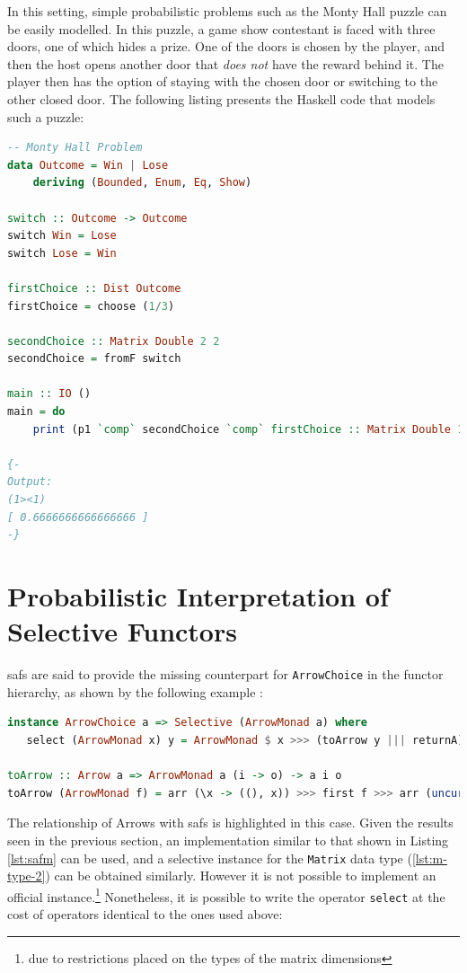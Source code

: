 \documentclass[
  oneside,
  11pt, a4paper,
  footinclude=true,
  headinclude=true,
  cleardoublepage=empty
]{scrbook}
\theoremstyle{definition}
\theoremstyle{definition}
\begin{document}
        In this setting, simple probabilistic problems such as the Monty Hall puzzle \citep{rosenhouse2009monty} can be easily modelled.
        In this puzzle, a game show contestant is faced with three doors, one of which hides a prize. One of the doors is chosen by the player, and then the host opens another door that \emph{does not} have the reward behind it. The player then has the option of staying with the chosen door or switching to the other closed door. The following listing presents the Haskell code that models such a puzzle:
        
        \begin{lstlisting}[language=Haskell, caption={LAoP Monty Hall Problem},captionpos=b]
-- Monty Hall Problem
data Outcome = Win | Lose
    deriving (Bounded, Enum, Eq, Show)

switch :: Outcome -> Outcome
switch Win = Lose
switch Lose = Win

firstChoice :: Dist Outcome
firstChoice = choose (1/3)

secondChoice :: Matrix Double 2 2
secondChoice = fromF switch 

main :: IO ()
main = do 
    print (p1 `comp` secondChoice `comp` firstChoice :: Matrix Double 1 1)
    
{- 
Output:
(1><1)
[ 0.6666666666666666 ]
-}
        \end{lstlisting}{}
        
    \section{Probabilistic Interpretation of Selective Functors}
        
        \glspl{saf} are said to provide the missing counterpart for \texttt{ArrowChoice} in the functor hierarchy, as shown by the following example \citep{andrey2019selective}:
        
        \begin{lstlisting}[language=Haskell, label={lst:safm}, caption={Selective ArrowMonad instance},captionpos=b]
instance ArrowChoice a => Selective (ArrowMonad a) where
   select (ArrowMonad x) y = ArrowMonad $ x >>> (toArrow y ||| returnA)
   
toArrow :: Arrow a => ArrowMonad a (i -> o) -> a i o
toArrow (ArrowMonad f) = arr (\x -> ((), x)) >>> first f >>> arr (uncurry ($))
        \end{lstlisting}{}
	    
	    The relationship of Arrows with \glspl{saf} is highlighted in this case. Given the results seen in the previous section, an implementation similar to that shown in Listing \ref{lst:safm} can be used, and a selective instance for the \texttt{Matrix} data type (\ref{lst:m-type-2}) can be obtained similarly. However it is not possible to implement an official instance.\footnote{due to restrictions placed on the types of the matrix dimensions} Nonetheless, it is possible to write the operator \texttt{select} at the cost of operators identical to the ones used above:
	    
\end{document}
